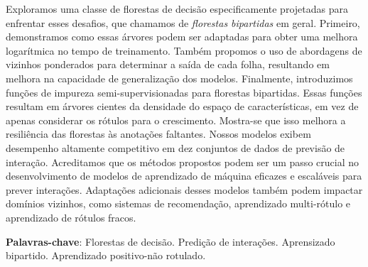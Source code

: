 \begin{resumo}
	Exploramos uma classe de florestas de decisão especificamente projetadas para enfrentar esses desafios, que chamamos de \emph{florestas bipartidas} em geral.
	Primeiro, demonstramos como essas árvores podem ser adaptadas para obter uma melhora logarítmica no tempo de treinamento. Também propomos o uso de abordagens de vizinhos ponderados para determinar a saída de cada folha, resultando em melhora na capacidade de generalização dos modelos.
	Finalmente, introduzimos funções de impureza semi-supervisionadas para florestas bipartidas. Essas funções resultam em árvores cientes da densidade do espaço de características, em vez de apenas considerar os rótulos para o crescimento. Mostra-se que isso melhora a resiliência das florestas às anotações faltantes. Nossos modelos exibem desempenho altamente competitivo em dez conjuntos de dados de previsão de interação.
	Acreditamos que os métodos propostos podem ser um passo crucial no desenvolvimento de modelos de aprendizado de máquina eficazes e escaláveis para prever interações. Adaptações adicionais desses modelos também podem impactar domínios vizinhos, como sistemas de recomendação, aprendizado multi-rótulo e aprendizado de rótulos fracos.

	\textbf{Palavras-chave}: Florestas de decisão. Predição de interações. Aprensizado bipartido. Aprendizado positivo-não rotulado.
\end{resumo}